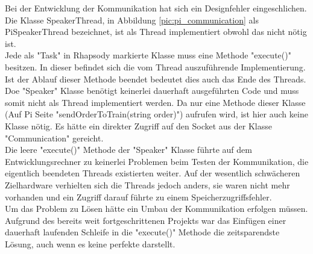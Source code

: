 Bei der Entwicklung der Kommunikation hat sich ein Designfehler eingeschlichen. Die Klasse SpeakerThread, in Abbildung \ref{pic:pi_communication} als PiSpeakerThread bezeichnet, ist als Thread implementiert obwohl das nicht nötig ist.\\
Jede als "Task" in Rhapsody markierte Klasse muss eine Methode "execute()" besitzen. In dieser befindet sich die vom Thread auszuführende Implementierung. Ist der Ablauf dieser Methode beendet bedeutet dies auch das Ende des Threads.\\
Doe "Speaker" Klasse benötigt keinerlei dauerhaft ausgeführten Code und muss somit nicht als Thread implementiert werden. Da nur eine Methode dieser Klasse (Auf Pi Seite "sendOrderToTrain(string order)") aufrufen wird, ist hier auch keine Klasse nötig. Es hätte ein direkter Zugriff auf den Socket aus der Klasse "Communication" gereicht.\\
Die leere "execute()" Methode der "Speaker" Klasse führte auf dem Entwicklungsrechner zu keinerlei Problemen beim Testen der Kommunikation, die eigentlich beendeten Threads existierten weiter. Auf der wesentlich schwächeren Zielhardware verhielten sich die Threads jedoch anders, sie waren nicht mehr vorhanden und ein Zugriff darauf führte zu einem Speicherzugriffsfehler.\\
Um das Problem zu Lösen hätte ein Umbau der Kommunikation erfolgen müssen. Aufgrund des bereits weit fortgeschrittenen Projekts war das Einfügen einer dauerhaft laufenden Schleife in die "execute()" Methode die zeitsparendste Lösung, auch wenn es keine perfekte darstellt.